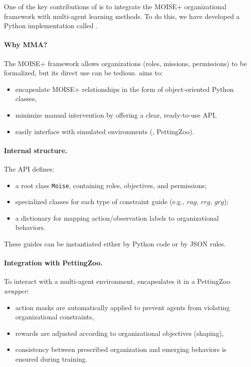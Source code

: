One of the key contributions of \footnotemark[1] is to integrate the MOISE+ organizational framework with multi-agent learning methods. To do this, we have developed a Python implementation called \footnotemark[2].



\paragraph{Why MMA?}
The MOISE+ framework allows organizations (roles, missions, permissions) to be formalized, but its direct use can be tedious.  aims to:
\begin{itemize}
  \item encapsulate MOISE+ relationships in the form of object-oriented Python classes,
  \item minimize manual intervention by offering a clear, ready-to-use API,
  \item easily interface with simulated environments (, PettingZoo).
\end{itemize}

\paragraph{Internal structure.}
The  API defines:
\begin{itemize}
  \item a root class \texttt{Moise}, containing roles, objectives, and permissions;
  \item specialized classes for each type of constraint guide (e.g., $rag$, $rrg$, $grg$);
  \item a dictionary for mapping action/observation labels to organizational behaviors.
\end{itemize}
These guides can be instantiated either by Python code or by JSON rules.

\paragraph{Integration with PettingZoo.}
To interact with a multi-agent environment,  encapsulates it in a PettingZoo \textit{wrapper}:
\begin{itemize}
\item action masks are automatically applied to prevent agents from violating organizational constraints,
\item rewards are adjusted according to organizational objectives (shaping),
\item consistency between prescribed organization and emerging behaviors is ensured during training.
\end {itemize}

